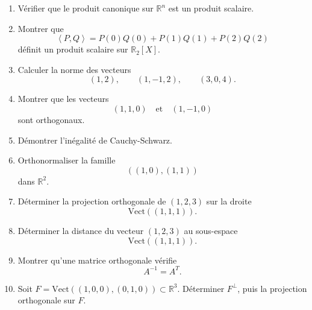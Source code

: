 \documentclass[11pt,a4paper]{article}
\theoremstyle{remark}
\newcommand{\R}{\mathbb{R}}
\newcommand{\Vect}{\mathrm{Vect}}
\newcommand{\scal}[2]{\left\langle #1,#2\right\rangle}
\newcommand{\Orth}{\perp}
\begin{document}
\begin{enumerate}[label=\textbf{Exercice \arabic*.}]
    \item Vérifier que le produit canonique sur \(\R^n\) est un produit scalaire.

    \item Montrer que
    \[
    \scal{P}{Q}=P(0)Q(0)+P(1)Q(1)+P(2)Q(2)
    \]
    définit un produit scalaire sur \(\R_2[X]\).

    \item Calculer la norme des vecteurs
    \[
    (1,2),\qquad (1,-1,2),\qquad (3,0,4).
    \]

    \item Montrer que les vecteurs
    \[
    (1,1,0)\quad \text{et} \quad (1,-1,0)
    \]
    sont orthogonaux.

    \item Démontrer l’inégalité de Cauchy-Schwarz.

    \item Orthonormaliser la famille
    \[
    ((1,0),(1,1))
    \]
    dans \(\R^2\).

    \item Déterminer la projection orthogonale de \((1,2,3)\) sur la droite
    \[
    \Vect((1,1,1)).
    \]

    \item Déterminer la distance du vecteur \((1,2,3)\) au sous-espace
    \[
    \Vect((1,1,1)).
    \]

    \item Montrer qu’une matrice orthogonale vérifie
    \[
    A^{-1}=A^T.
    \]

    \item Soit \(F=\Vect((1,0,0),(0,1,0))\subset \R^3\). Déterminer \(F^\Orth\), puis la projection orthogonale sur \(F\).
\end{enumerate}
\end{document}
